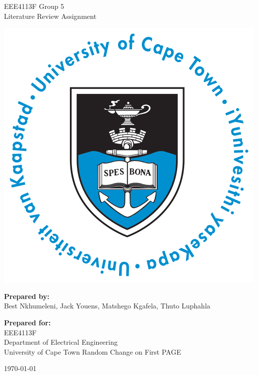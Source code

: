 \thispagestyle{empty}
\begin{center}
    
\Huge

\vspace{5cm}

EEE4113F Group 5\\Literature Review Assignment

\vspace{2.5cm}

\includegraphics[width=0.4\linewidth]{FrontMatter/UCT_logo.png}

\vfill

\large
\textbf{Prepared by:}\\
Best Nkhumeleni, Jack Youens, Matshego Kgafela, Thuto Luphahla

\vspace{1cm}

\textbf{Prepared for:}\\
EEE4113F\\
Department of Electrical Engineering\\
University of Cape Town
Random Change on First PAGE

\vspace{2cm}

\today


\end{center}
